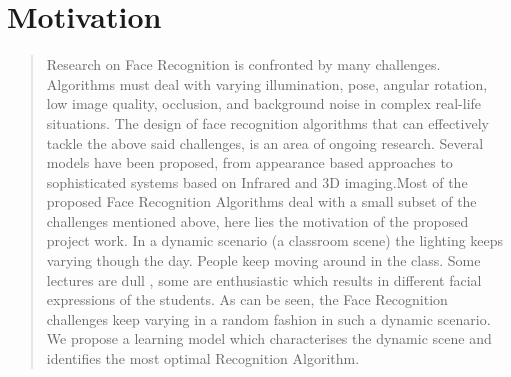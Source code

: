 \section*{Motivation}
\begin{quote}
Research on Face Recognition is confronted by many challenges. Algorithms must deal with varying illumination, pose, angular rotation, low image quality, occlusion, and background noise in complex real-life situations. The design of face recognition algorithms that can effectively tackle the above said challenges, is an area of ongoing research. Several models have been proposed, from appearance based approaches to sophisticated systems based on Infrared and 3D imaging.Most of the proposed Face Recognition Algorithms deal with a small subset of the challenges mentioned above, here lies the motivation of the proposed project work. In a dynamic scenario (a classroom scene) the lighting keeps varying though the day. People keep moving around in the class. Some lectures are dull , some are enthusiastic which results in different facial expressions of the students. As can be seen, the Face Recognition challenges keep varying in a random fashion in such a dynamic scenario. We propose a learning model which characterises the dynamic scene and identifies the most optimal Recognition Algorithm.
\end{quote}
